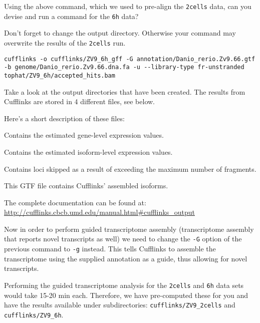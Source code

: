 \begin{questions}
Using the above command, which we used to pre-align the \texttt{2cells} data,
can you devise and run a command for the \texttt{6h} data?
\begin{warning}
Don't forget to change the output directory.
Otherwise your command may overwrite the results of the \texttt{2cells} run.
\end{warning}
\begin{answer}
\begin{lstlisting}
cufflinks -o cufflinks/ZV9_6h_gff -G annotation/Danio_rerio.Zv9.66.gtf -b genome/Danio_rerio.Zv9.66.dna.fa -u --library-type fr-unstranded tophat/ZV9_6h/accepted_hits.bam
\end{lstlisting}
\end{answer}

Take a look at the output directories that have been created. The results from
Cufflinks are stored in 4 different files, see below.
\end{questions}

\begin{information}
Here's a short description of these files:

\begin{description}[style=multiline,labelindent=0cm,align=right,leftmargin=\descriptionlabelspace,rightmargin=1.5cm,font=\ttfamily]
\item[genes.fpkm\_tracking] Contains the estimated gene-level expression values.
\item[isoforms.fpkm\_tracking] Contains the estimated isoform-level expression values.
\item[skipped.gtf] Contains loci skipped as a result of exceeding the maximum number of fragments.
\item[transcripts.gtf] This GTF file contains Cufflinks' assembled isoforms.
\end{description}

The complete documentation can be found at:
\url{http://cufflinks.cbcb.umd.edu/manual.html#cufflinks_output}
\end{information}

Now in order to perform guided transcriptome assembly (transcriptome assembly
that reports novel transcripts as well) we need to change the \texttt{-G}
option of the previous command to \texttt{-g} instead.
This tells Cufflinks to assemble the transcriptome using the supplied
annotation as a guide, thus allowing for novel transcripts.

\begin{information}
Performing the guided transcriptome analysis for the \texttt{2cells} and
\texttt{6h} data sets would take 15-20 min each. Therefore, we have
pre-computed these for you and have the results available under subdirectories:
\texttt{cufflinks/ZV9\_2cells} and \texttt{cufflinks/ZV9\_6h}.
\end{information}

